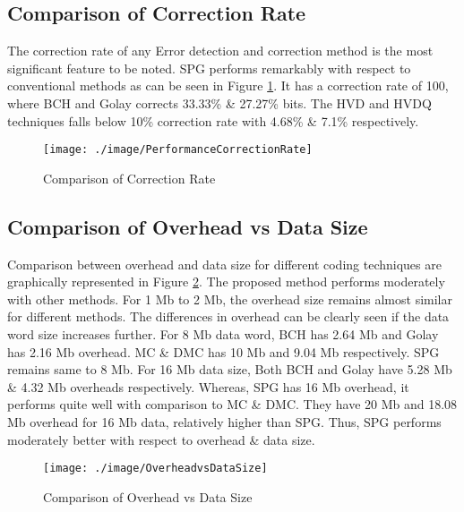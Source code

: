 \documentclass[12pt,a4paper]{report}
\begin{document}
\subsection{Comparison of Correction Rate}


The correction rate of any Error detection and correction method is the most significant feature to be noted. SPG performs remarkably with respect to conventional methods as can be seen in Figure \ref{fig:PerformanceCorrectionRate}. It has a correction rate of 100, where BCH and Golay corrects 33.33\% \& 27.27\% bits. The HVD and HVDQ techniques falls below 10\% correction rate with 4.68\% \& 7.1\% respectively.\\

 \begin{figure}[!hb]
 \centering
 \texttt{[image: ./image/PerformanceCorrectionRate]}
 \caption{Comparison of Correction Rate}
 \label{fig:PerformanceCorrectionRate}
 \end{figure}

\subsection{Comparison of Overhead vs Data Size}
Comparison between overhead and data size for different coding techniques are graphically represented in Figure \ref{fig:OverheadvsDataSize}. The proposed method performs moderately with other methods. For 1 Mb to 2 Mb, the overhead size remains almost similar for different methods. The differences in overhead can be clearly seen if the data word size increases further. For 8 Mb data word, BCH has 2.64 Mb and Golay has 2.16 Mb overhead. MC \& DMC has 10 Mb and 9.04 Mb respectively. SPG remains same to 8 Mb.  For 16 Mb data size, Both BCH and Golay have 5.28 Mb \& 4.32 Mb overheads respectively. Whereas, SPG has 16 Mb overhead, it performs quite well with comparison to MC \& DMC. They have 20 Mb and 18.08 Mb overhead for 16 Mb data, relatively higher than SPG. Thus, SPG performs moderately better with respect to overhead \& data size.

 \begin{figure}[!ht]
  \centering
  \texttt{[image: ./image/OverheadvsDataSize]}
  \caption{Comparison of Overhead vs Data Size}
  \label{fig:OverheadvsDataSize}
  \end{figure}
\end{document}
